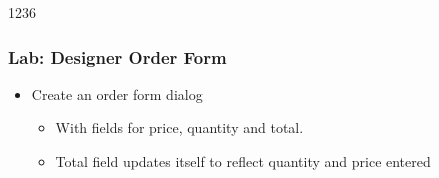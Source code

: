\begin{slide}[fragile]{1236}
\frametitle{Lab: Designer Order Form}
\begin{itemize}
\item Create an order form dialog
  \begin{itemize}
  \item With fields for price, quantity and total.
  \item Total field updates itself to reflect quantity and price entered
  \end{itemize}
\end{itemize} 




\end{slide}

